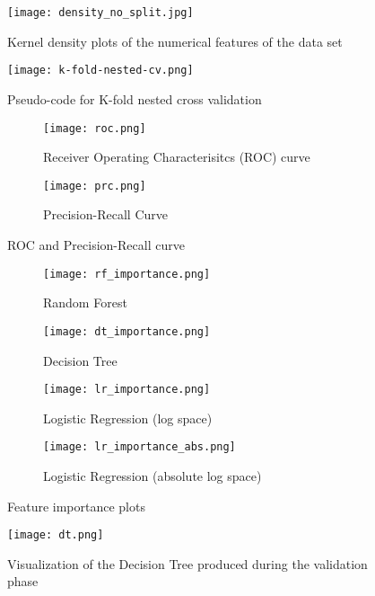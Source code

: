 \begin{figure}[ht]
    \centering
    \texttt{[image: density\_no\_split.jpg]}
    \caption{Kernel density plots of the numerical features of the data set}
    \label{fig:density}
\end{figure}
\begin{figure}[ht]
 \centering
 \texttt{[image: k-fold-nested-cv.png]}
 \caption{Pseudo-code for K-fold nested cross validation \cite{RN194}}
 \label{fig:cv}
\end{figure}
\begin{figure}
 \centering
 \begin{subfigure}{0.6\textwidth}
  \centering
  \texttt{[image: roc.png]}
  \caption{Receiver Operating Characterisitcs (ROC) curve}
  \label{fig:roc}
 \end{subfigure}
 \begin{subfigure}{0.6\textwidth}
  \centering
  \texttt{[image: prc.png]}
  \caption{Precision-Recall Curve}
  \label{fig:prc}
 \end{subfigure}
 \caption{ROC and Precision-Recall curve}
 \label{fig:prc-roc}
\end{figure}

\begin{figure}
 \begin{subfigure}{0.5\textwidth}
  \texttt{[image: rf\_importance.png]}
  \caption{Random Forest}
  \label{fig:rf_importance}
 \end{subfigure}
 \begin{subfigure}{0.5\textwidth}
  \texttt{[image: dt\_importance.png]}
  \caption{Decision Tree}
  \label{fig:dt_importance}
 \end{subfigure}
 \begin{subfigure}{0.5\textwidth}
  \texttt{[image: lr\_importance.png]}
  \caption{Logistic Regression (log space)}
  \label{fig:lr_importance}
 \end{subfigure}
 \begin{subfigure}{0.5\textwidth}
  \texttt{[image: lr\_importance\_abs.png]}
  \caption{Logistic Regression (absolute log space)}
  \label{fig:lr_importance_abs}
 \end{subfigure}

 \caption{Feature importance plots}
 \label{fig:feature-importance}
\end{figure}
\begin{figure}
 \texttt{[image: dt.png]}
 \caption{Visualization of the Decision Tree produced during the validation 
phase}
 \label{fig:dt}
\end{figure}



